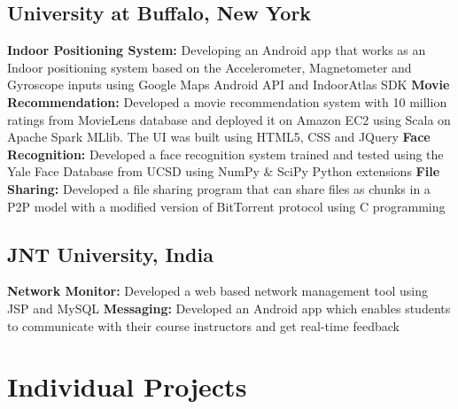 \documentclass[11pt,a4paper,sans]{moderncv}
\begin{document}
\subsection{University at Buffalo, New York}
{\textbf{Indoor Positioning System:} Developing an Android app that works as an Indoor positioning system based on the Accelerometer, Magnetometer and Gyroscope inputs using Google Maps Android API and IndoorAtlas SDK}
{\textbf{Movie Recommendation:} Developed a movie recommendation system with 10 million ratings from MovieLens database and deployed it on Amazon EC2 using Scala on Apache Spark MLlib. The UI was built using HTML5, CSS and JQuery}
{\textbf{Face Recognition:} Developed a face recognition system trained and tested using the Yale Face Database from UCSD using NumPy \& SciPy Python extensions}{}
{\textbf{File Sharing:} Developed a file sharing program that can share files as chunks in a P2P model with a modified version of BitTorrent protocol using C programming}{}
\vspace*{-1mm}
\subsection{JNT University, India}
{\textbf{Network Monitor:} Developed a web based network management tool using JSP and MySQL}
{\textbf{Messaging:} Developed an Android app which enables students to communicate with their course instructors and get real-time feedback }
\section{Individual Projects}

\end{document}
